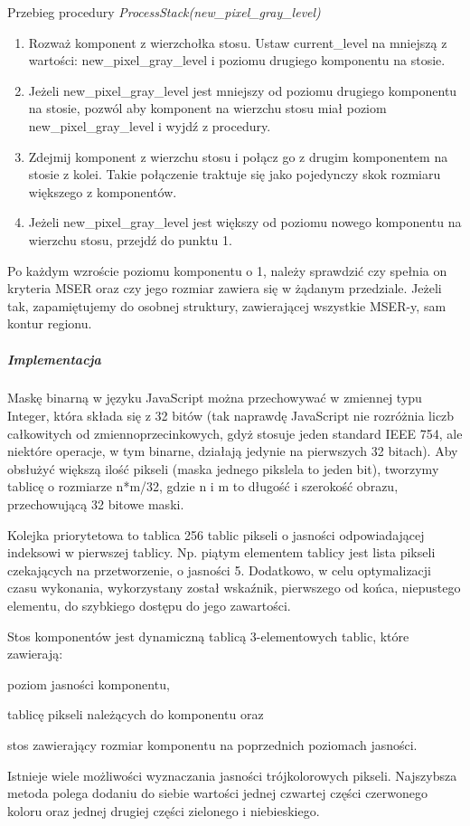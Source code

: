 Przebieg procedury \textit{ProcessStack(new\_pixel\_gray\_level)}
\begin{enumerate} \item Rozważ komponent z wierzchołka stosu. Ustaw
    current\_level na mniejszą z wartości: new\_pixel\_gray\_level i poziomu
    drugiego komponentu na stosie. \item Jeżeli new\_pixel\_gray\_level jest
    mniejszy od poziomu drugiego komponentu na stosie, pozwól aby komponent na
    wierzchu stosu miał poziom new\_pixel\_gray\_level i wyjdź z procedury.
  \item Zdejmij komponent z wierzchu stosu i połącz go z drugim komponentem na stosie z
    kolei.  Takie połączenie traktuje się jako pojedynczy skok rozmiaru
    większego z komponentów.  \item Jeżeli new\_pixel\_gray\_level jest większy
    od poziomu nowego komponentu na wierzchu stosu, przejdź do punktu 1.
\end{enumerate}

Po każdym wzroście poziomu komponentu o 1, należy sprawdzić czy spełnia on
kryteria MSER oraz czy jego rozmiar zawiera się w żądanym przedziale. Jeżeli
tak, zapamiętujemy do osobnej struktury, zawierającej wszystkie MSER-y, sam
kontur regionu.

\subparagraph{Implementacja}

Maskę binarną w języku JavaScript można przechowywać w zmiennej typu Integer,
która składa się z 32 bitów (tak naprawdę JavaScript nie rozróżnia liczb
całkowitych od zmiennoprzecinkowych, gdyż stosuje jeden standard IEEE 754, ale
niektóre operacje, w tym binarne, działają jedynie na pierwszych 32 bitach).
Aby obsłużyć większą ilość pikseli (maska jednego pikslela to jeden bit),
tworzymy tablicę o rozmiarze n*m/32, gdzie n i m to długość i szerokość obrazu,
przechowującą 32 bitowe maski.

Kolejka priorytetowa to tablica 256 tablic pikseli o jasności odpowiadającej indeksowi w
pierwszej tablicy. Np. piątym elementem tablicy jest lista pikseli czekających
na przetworzenie, o jasności 5. Dodatkowo, w celu optymalizacji czasu wykonania,
wykorzystany został wskaźnik, pierwszego od końca, niepustego elementu, do
szybkiego dostępu do jego zawartości.

Stos komponentów jest dynamiczną tablicą 3-elementowych tablic, które
zawierają: \begin{inparaenum} \item poziom jasności komponentu, \item tablicę
  pikseli należących do komponentu oraz \item stos zawierający rozmiar
  komponentu na poprzednich poziomach jasności.  
\end{inparaenum}

Istnieje wiele możliwości wyznaczania jasności trójkolorowych pikseli.
Najszybsza metoda polega dodaniu do siebie wartości jednej czwartej części
czerwonego koloru oraz jednej drugiej części zielonego i niebieskiego.
